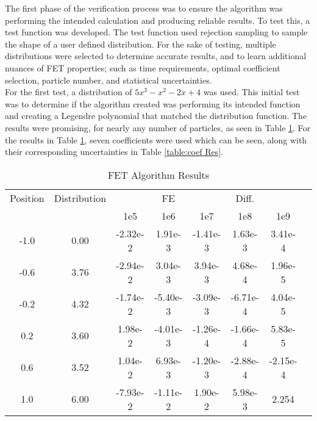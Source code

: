 \documentclass[10tma4paper]{article}
\begin{document}
The first phase of the verification process was to ensure the algorithm was performing the intended calculation and producing reliable results. To test this, a test function was developed. The test function used rejection sampling to sample the shape of a user defined distribution. For the sake of testing, multiple distributions were selected to determine accurate results, and to learn additional nuances of FET properties; such as time requirements, optimal coefficient selection, particle number, and statistical uncertainties.
\\
For the first test, a distribution of $5x^{3}-x^{2}-2x+4$ was used. This initial test was to determine if the algorithm created was performing its intended function and creating a Legendre polynomial that matched the distribution function. The results were promising, for nearly any number of particles, as seen in Table \ref{table:Alg Res}. For the results in Table \ref{table:Alg Res}, seven coefficients were used which can be seen, along with their corresponding uncertainties in Table \ref{table:coef Res}.
\begin{table}[htbp!]
	\caption{FET Algorithm Results}
	\centering
	\begin{tabular}{c c c c c c c c}
		\hline
		Position & Distribution &  & FE &  & Diff. &  &\\[0.5ex]
		 & & 1e5 & 1e6 & 1e7 & 1e8 & 1e9 &\\
		 \hline
		 \hline
		-1.0 & 0.00 & -2.32e-2 & 1.91e-3  & -1.41e-3 & 1.63e-3  & 3.41e-4  & \\
		-0.6 & 3.76 & -2.94e-2 & 3.04e-3  & 3.94e-3  & 4.68e-4  & 1.96e-5  & \\
		-0.2 & 4.32 & -1.74e-2 & -5.40e-3 & -3.09e-3 & -6.71e-4 & 4.04e-5  & \\
		 0.2 & 3.60 & 1.98e-2  & -4.01e-3 & -1.26e-4 & -1.66e-4 & 5.83e-5  & \\
		 0.6 & 3.52 & 1.04e-2  & 6.93e-3  & -1.20e-3 & -2.88e-4 & -2.15e-4 & \\
		 1.0 & 6.00 & -7.93e-2 & -1.11e-2 & 1.90e-2  & 5.98e-3  & 2.254    & \\ [1ex]
		\hline
	\end{tabular}
	\label{table:Alg Res}
\end{table}
\end{document}

